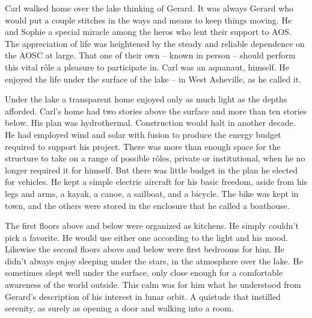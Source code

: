 Carl walked home over the lake thinking of Gerard.  It was always
Gerard who would put a couple stitches in the ways and means to keep
things moving.  He and Sophie a special miracle among the heros who
lent their support to AOS.  The appreciation of life was heightened by
the steady and reliable dependence on the AOSC at large.  That one of
their own -- known in person -- should perform this vital r\^ole a
pleasure to participate in.  Carl was an aquanaut, himself.  He
enjoyed the life under the surface of the lake -- in West Asheville,
as he called it.



Under the lake a transparent home enjoyed only as much light as the
depths afforded.  Carl's home had two stories above the surface and
more than ten stories below.  His plan was hydrothermal.  Construction
would halt in another decade.  He had employed wind and solar with
fusion to produce the energy budget required to support his project.
There was more than enough space for the structure to take on a range
of possible r\^oles, private or institutional, when he no longer
required it for himself.  But there was little budget in the plan he
elected for vehicles.  He kept a simple electric aircraft for his
basic freedom, aside from his legs and arms, a kayak, a canoe, a
sailboat, and a bicycle.  The bike was kept in town, and the others
were stored in the enclosure that he called a boathouse.

The first floors above and below were organized as kitchens.  He
simply couldn't pick a favorite.  He would use either one according to
the light and his mood.  Likewise the second floors above and below
were first bedrooms for him.  He didn't always enjoy sleeping under
the stars, in the atmosphere over the lake.  He sometimes slept well
under the surface, only close enough for a comfortable awareness of
the world outside.  This calm was for him what he understood from
Gerard's description of his interest in lunar orbit.  A quietude that
instilled serenity, as surely as opening a door and walking into a
room.



